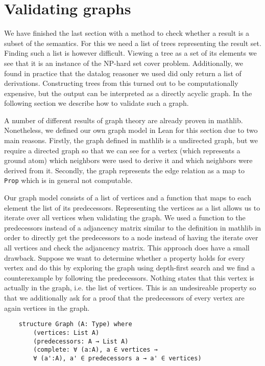 \section{Validating graphs}

We have finished the last section with a method to check whether a result is a subset of the semantics. For this we need a list of trees representing the result set. Finding such a list is however difficult. Viewing a tree as a set of its elements we see that it is an instance of the NP-hard set cover problem. Additionally, we found in practice that the datalog reasoner we used did only return a list of derivations. Constructing trees from this turned out to be computationally expensive, but the output can be interpreted as a directly acyclic graph. In the following section we describe how to validate such a graph.

A number of different results of graph theory are already proven in mathlib. Nonetheless, we defined our own graph model in Lean for this section due to two main reasons. Firstly, the graph defined in mathlib is a undirected graph, but we require a directed graph so that we can see for a vertex (which represents a ground atom) which neighbors were used to derive it and which neighbors were derived from it. Secondly, the graph represents the edge relation as a map to \texttt{Prop} which is in general not computable.


Our graph model consists of a list of vertices and a function that maps to each element the list of its predecessors. Representing the vertices as a list allows us to iterate over all vertices when validating the graph. We used a function to the predecessors instead of a adjancency matrix similar to the definition in mathlib in order to directly get the predecessors to a node instead of having the iterate over all vertices and check the adjancency matrix. This approach does have a small drawback. Suppose we want to determine whether a property holds for every vertex and do this by exploring the graph using depth-first search and we find a counterexample by following the predecessors. Nothing states that this vertex is actually in the graph, i.e. the list of vertices. This is an undesireable property so that we additionally ask for a proof that the predecessors of every vertex are again vertices in the graph.

\begin{lstlisting}
    structure Graph (A: Type) where
        (vertices: List A)
        (predecessors: A → List A)
        (complete: ∀ (a:A), a ∈ vertices →  
        ∀ (a':A), a' ∈ predecessors a → a' ∈ vertices)
\end{lstlisting}

